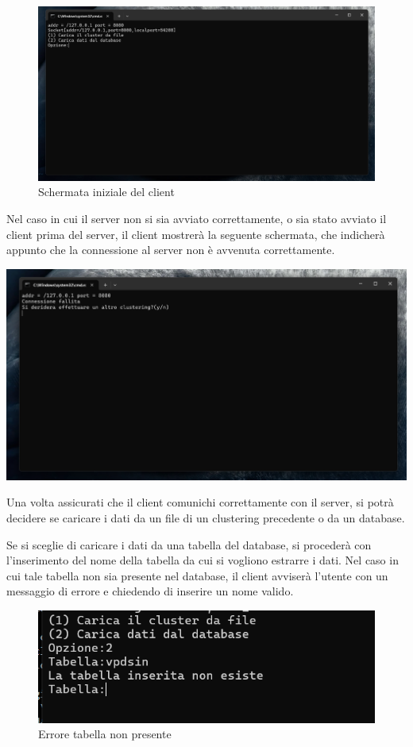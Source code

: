 \begin{figure}[h!]
    \centering
    \includegraphics[width = 0.5 \textwidth]{images/normale funzionamento lcient.png}
    \caption{Schermata iniziale del client}
    
\end{figure}

\begin{tcolorbox}[  colback=white!5!white, colframe=gray, title={Avvertenza} ]

    Nel caso in cui il server non si sia avviato correttamente, o sia stato avviato il client prima del server, il client mostrerà la seguente schermata, che indicherà appunto che la connessione al server non è avvenuta correttamente.
    
    \begin{center} 
        \includegraphics[width = 0.5 \textwidth]{images/connessione fallita.png}
    \end{center}
        
\end{tcolorbox}

Una volta assicurati che il client comunichi correttamente con il server, si potrà decidere se caricare i dati da un file di un clustering precedente o da un database.


Se si sceglie di caricare i dati da una tabella del database, si procederà con l'inserimento del nome della tabella da cui si vogliono estrarre i dati. Nel caso in cui tale tabella non sia presente nel database, il client avviserà l'utente con un messaggio di errore e chiedendo di inserire un nome valido. 

\begin{figure}[h!]
    \centering
    \includegraphics[width = 0.5 \textwidth]{images/teabella inesistente.png}
    \caption{Errore tabella non presente}
\end{figure}

